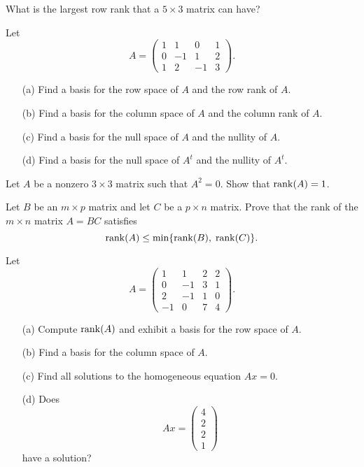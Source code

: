 \documentclass{ximera}
\begin{document}
\begin{exercise} \label{c5.8.2}
What is the largest row rank that a $5\times 3$ matrix can have?
\end{exercise}

\begin{exercise} \label{c5.8.3}
Let
\[
A = \left(\begin{array}{rrrr} 1 & 1 & 0 & 1\\ 0 & -1 & 1 & 2\\
1 & 2 & -1 & 3 \end{array}\right).
\]
\begin{itemize}
\item[(a)]  Find a basis for the row space of $A$ and the row rank of $A$.
\item[(b)]  Find a basis for the column space of $A$ and the column rank of
$A$.
\item[(c)]  Find a basis for the null space of $A$ and the nullity of $A$.
\item[(d)]  Find a basis for the null space of $A^t$ and the nullity of $A^t$.
\end{itemize}
\end{exercise}

\begin{exercise} \label{c5.8.4}
Let $A$ be a nonzero $3\times 3$ matrix such that $A^2=0$.  Show that
${\rm rank}(A)=1$.
\end{exercise}

\begin{exercise} \label{c5.8.5}
Let $B$ be an $m\times p$ matrix and let $C$ be a $p\times n$
matrix. Prove that the rank of the $m\times n$ matrix $A=BC$
satisfies
\[
{\rm rank}(A) \leq \min\{{\rm rank}(B),\;{\rm rank}(C)\}.
\]
\end{exercise}



\CEXER

\begin{exercise} \label{c5.8.6}
Let
\begin{equation*}
A = \left(\begin{array}{rrrr} 1 & 1 & 2 & 2 \\ 0 & -1 & 3 & 1 \\
   2 & -1 & 1 & 0 \\ -1 & 0 & 7 & 4 \end{array}\right).
\end{equation*}
\begin{itemize}
\item[(a)]  Compute ${\rm rank}(A)$ and exhibit a basis for the row space of $A$.
\item[(b)]  Find a basis for the column space of $A$.
\item[(c)]  Find all solutions to the homogeneous equation $Ax=0$.
\item[(d)]  Does
\[
Ax = \left( \begin{array}{c} 4 \\ 2\\ 2\\ 1 \end{array} \right)
\]
have a solution?
\end{itemize}
\end{exercise}
\end{document}

